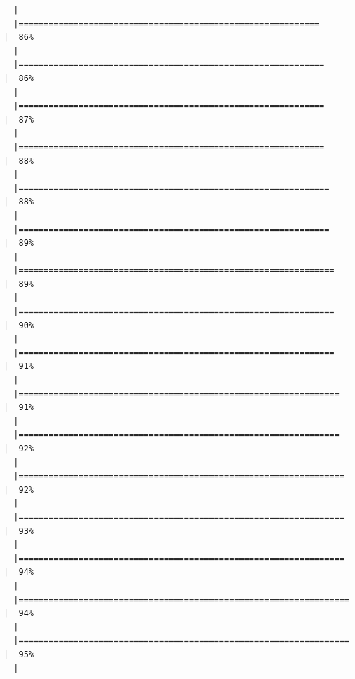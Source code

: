 \documentclass[
  letterpaper,
  DIV=11,
  numbers=noendperiod]{scrreprt}
\begin{document}
\begin{verbatim}
  |                                                                            
  |============================================================          |  86%
  |                                                                            
  |=============================================================         |  86%
  |                                                                            
  |=============================================================         |  87%
  |                                                                            
  |=============================================================         |  88%
  |                                                                            
  |==============================================================        |  88%
  |                                                                            
  |==============================================================        |  89%
  |                                                                            
  |===============================================================       |  89%
  |                                                                            
  |===============================================================       |  90%
  |                                                                            
  |===============================================================       |  91%
  |                                                                            
  |================================================================      |  91%
  |                                                                            
  |================================================================      |  92%
  |                                                                            
  |=================================================================     |  92%
  |                                                                            
  |=================================================================     |  93%
  |                                                                            
  |=================================================================     |  94%
  |                                                                            
  |==================================================================    |  94%
  |                                                                            
  |==================================================================    |  95%
  |                                                                            

\end{verbatim}
\end{document}
